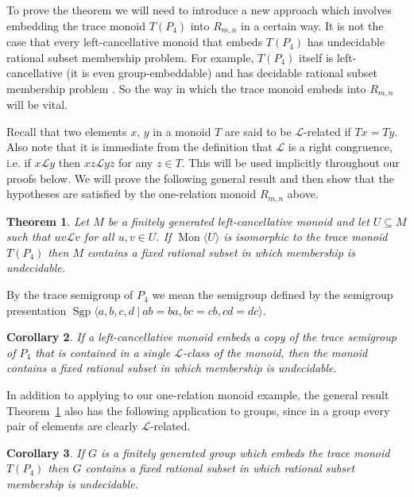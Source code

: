 \documentclass{amsart}
\newcommand{\Mgen}[1]{\operatorname{Mon}\bigl\langle #1 \bigr\rangle}
\newcommand{\Spres}[2]{\operatorname{Sgp}\bigl\langle #1\:|\:#2 \bigr\rangle}
\newcommand{\M}{R_{m,n}}
\newcommand{\gl}{\mathcal{L}}
\theoremstyle{plain}
\newtheorem{theorem}{Theorem}[section]
\newtheorem{cor}[theorem]{Corollary}
\theoremstyle{definition}
\begin{document}
To prove the theorem we will need to introduce a new approach which involves embedding the trace monoid $T(P_4)$ into $\M$ in a certain way. It is not the case that every left-cancellative monoid that embeds $T(P_4)$ has undecidable rational subset membership problem. For example, $T(P_4)$ itself is left-cancellative (it is even group-embeddable) and has decidable rational subset membership problem \cite{Diekert1990}. So the way in which the trace monoid embeds into $\M$ will be vital.       

Recall \cite[Chapter~II]{Howie1995} that two elements $x$, $y$ in a monoid $T$ are said to be $\gl$-related if $Tx = Ty$. Also note that it is immediate from the definition that $\gl$ is a right congruence, i.e. if $x \gl y$ then $xz \gl yz$ for any $z \in T$. This will be used implicitly throughout our proofs below. We will prove the following general result and then show that the hypotheses are satisfied by the one-relation monoid $\M$ above.    

\begin{theorem}\label{thm_LClassEmbeddingTraceMonoidImproved} 
Let $M$ be a finitely generated left-cancellative monoid and let $U \subseteq M$ such that $u v \gl v$ for all $u, v \in U$. 
If $\Mgen{U}$ is isomorphic to the trace monoid $T(P_4)$ then   
$M$ contains a fixed rational subset in which membership is undecidable.  
\end{theorem}

By the trace semigroup of $P_4$ we mean the semigroup defined by the semigroup presentation $\Spres{a,b,c,d}{ab=ba, bc=cb, cd=dc}$. 

\begin{cor} 
If a left-cancellative monoid embeds a copy of the trace semigroup of $P_4$ 
that is 
contained in a single $\gl$-class of the monoid, then the monoid contains a fixed rational subset in which membership is undecidable.  
\end{cor}

In addition to applying to our one-relation monoid example, the general result Theorem~\ref{thm_LClassEmbeddingTraceMonoidImproved} also has the following application to groups, since in a group every pair of elements are clearly $\gl$-related.  

\begin{cor}\label{cor_T4EmbedsInGroup}
If $G$ is a finitely generated group which embeds the trace monoid $T(P_4)$ then $G$ contains a fixed rational subset in which rational subset membership is undecidable. 
\end{cor}
\end{document}
